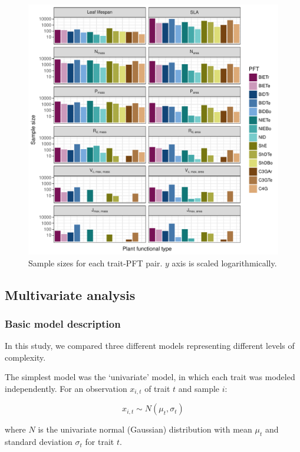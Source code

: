 \begin{figure}
  \centering
  \includegraphics[width=\textwidth]{1_mvtraits/figures/sample_size.pdf}
  \caption{%
    Sample sizes for each trait-PFT pair. $y$ axis is scaled logarithmically.
  }\label{fig:mvtraits-fig1}
\end{figure}


\subsection{Multivariate analysis}

\subsubsection{Basic model description}

In this study, we compared three different models representing different levels of complexity.

The simplest model was the ‘univariate’ model, in which each trait was modeled independently.
For an observation $x_{i,t}$ of trait $t$ and sample $i$:

\[x_{i,t} \sim N(\mu_t, \sigma_t)\]

where $N$ is the univariate normal (Gaussian) distribution with mean $\mu_t$ and standard deviation $\sigma_t$ for trait $t$.


